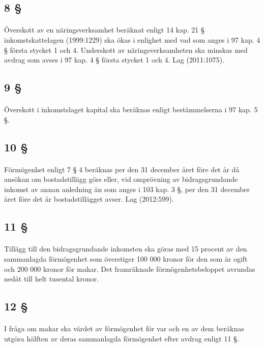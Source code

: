 \documentclass[a4paper,notitlepage,openany,10pt]{book}
\begin{document}
\subsection*{8 §}
\paragraph*{}
Överskott av en näringsverksamhet beräknat enligt 14 kap. 21 § inkomstskattelagen (1999:1229) ska ökas i enlighet med vad som anges i 97 kap. 4 § första stycket 1 och 4. Underskott av näringsverksamheten ska minskas med avdrag som avses i 97 kap. 4 § första stycket 1 och 4.
Lag (2011:1075).
\subsection*{9 §}
\paragraph*{}
Överskott i inkomstslaget kapital ska beräknas enligt bestämmelserna i 97 kap. 5 §.
\subsection*{10 §}
\paragraph*{}
Förmögenhet enligt 7 § 4 beräknas per den 31 december året före det år då ansökan om bostadstillägg görs eller, vid omprövning av bidragsgrundande inkomst av annan anledning än som anges i 103 kap. 3 §, per den 31 december året före det år bostadstillägget avser.
Lag (2012:599).
\subsection*{11 §}
\paragraph*{}
Tillägg till den bidragsgrundande inkomsten ska göras med 15 procent av den sammanlagda förmögenhet som överstiger 100 000 kronor för den som är ogift och 200 000 kronor för makar. Det framräknade förmögenhetsbeloppet avrundas nedåt till helt tusental kronor.
\subsection*{12 §}
\paragraph*{}
I fråga om makar ska värdet av förmögenhet för var och en av dem beräknas utgöra hälften av deras sammanlagda förmögenhet efter avdrag enligt 11 §.
\end{document}
